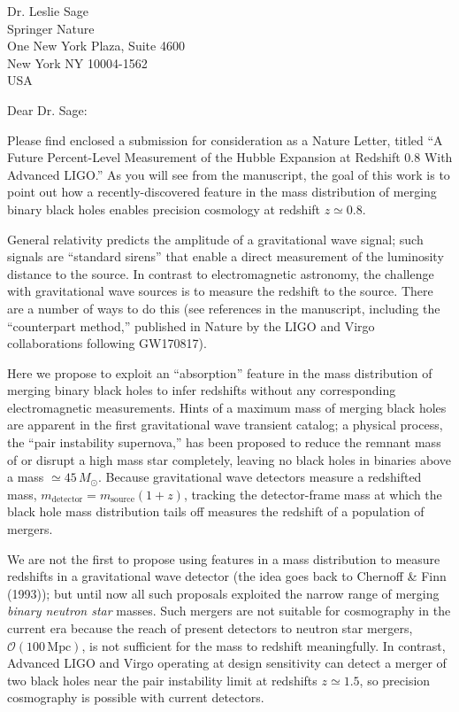 \documentclass{letter}
\begin{document}
\begin{letter}{Dr. Leslie Sage\\Springer Nature\\One New York Plaza, Suite 4600\\New York NY 10004-1562\\USA}

\opening{Dear Dr. Sage:}

Please find enclosed a submission for consideration as a Nature Letter, titled
``A Future Percent-Level Measurement of the Hubble Expansion at Redshift 0.8
With Advanced LIGO.''  As you will see from the manuscript, the goal of this
work is to point out how a recently-discovered feature in the mass distribution
of merging binary black holes enables precision cosmology at redshift $z \simeq
0.8$.

General relativity predicts the amplitude of a gravitational wave signal; such
signals are ``standard sirens'' that enable a direct measurement of the
luminosity distance to the source.  In contrast to electromagnetic astronomy,
the challenge with gravitational wave sources is to measure the redshift to the
source.  There are a number of ways to do this (see references in the
manuscript, including the ``counterpart method,'' published in Nature by the
LIGO and Virgo collaborations following GW170817).

Here we propose to exploit an ``absorption'' feature in the mass distribution of
merging binary black holes to infer redshifts without any corresponding
electromagnetic measurements.  Hints of a maximum mass of merging black holes
are apparent in the first gravitational wave transient catalog; a physical
process, the ``pair instability supernova,'' has been proposed to reduce the
remnant mass of or disrupt a high mass star completely, leaving no black holes
in binaries above a mass $\simeq 45 \, M_\odot$.  Because gravitational wave
detectors measure a redshifted mass, $m_\mathrm{detector} = m_\mathrm{source}
(1+z)$, tracking the detector-frame mass at which the black hole mass
distribution tails off measures the redshift of a population of mergers.

We are not the first to propose using features in a mass distribution to measure
redshifts in a gravitational wave detector (the idea goes back to Chernoff \&
Finn (1993)); but until now all such proposals exploited the narrow range of
merging \emph{binary neutron star} masses.  Such mergers are not suitable for
cosmography in the current era because the reach of present detectors to neutron
star mergers, $\mathcal{O}\left( 100 \, \mathrm{Mpc} \right)$, is not sufficient
for the mass to redshift meaningfully.  In contrast, Advanced LIGO and Virgo
operating at design sensitivity can detect a merger of two black holes near the
pair instability limit at redshifts $z \simeq 1.5$, so precision cosmography is
possible with current detectors.


\end{letter}
\end{document}
